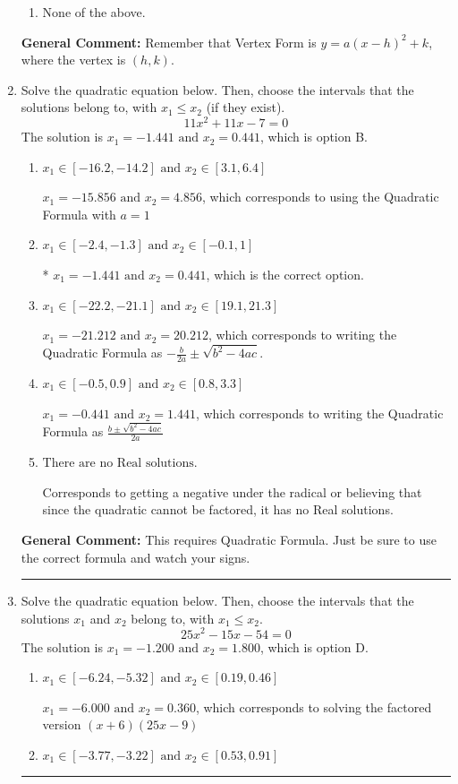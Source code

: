 \documentclass{extbook}[14pt]
\newcommand{\litem}[1]{\item #1

\rule{\textwidth}{0.4pt}}
\begin{document}
\begin{enumerate}
{\begin{enumerate}[label=\Alph*.]
\begin{multicols}{2}
\end{multicols}\item None of the above.\end{enumerate}
\textbf{General Comment:} Remember that Vertex Form is $y = a(x-h)^2+k$, where the vertex is $(h, k)$.
}
\litem{
Solve the quadratic equation below. Then, choose the intervals that the solutions belong to, with $x_1 \leq x_2$ (if they exist).
\[ 11x^{2} +11 x -7 = 0 \]The solution is \( x_1 = -1.441 \text{ and } x_2 = 0.441 \), which is option B.\begin{enumerate}[label=\Alph*.]
\item \( x_1 \in [-16.2, -14.2] \text{ and } x_2 \in [3.1, 6.4] \)

 $x_1 = -15.856 \text{ and } x_2 = 4.856$, which corresponds to using the Quadratic Formula with $a=1$
\item \( x_1 \in [-2.4, -1.3] \text{ and } x_2 \in [-0.1, 1] \)

* $x_1 = -1.441 \text{ and } x_2 = 0.441$, which is the correct option.
\item \( x_1 \in [-22.2, -21.1] \text{ and } x_2 \in [19.1, 21.3] \)

 $x_1 = -21.212 \text{ and } x_2 = 20.212$, which corresponds to writing the Quadratic Formula as $-\frac{b}{2a} \pm \sqrt{b^2 - 4ac}$.
\item \( x_1 \in [-0.5, 0.9] \text{ and } x_2 \in [0.8, 3.3] \)

 $x_1 = -0.441 \text{ and } x_2 = 1.441$, which corresponds to writing the Quadratic Formula as $\frac{b \pm \sqrt{b^2 - 4ac}}{2a}$
\item \( \text{There are no Real solutions.} \)

Corresponds to getting a negative under the radical or believing that since the quadratic cannot be factored, it has no Real solutions.
\end{enumerate}

\textbf{General Comment:} This requires Quadratic Formula. Just be sure to use the correct formula and watch your signs.
}
\litem{
Solve the quadratic equation below. Then, choose the intervals that the solutions $x_1$ and $x_2$ belong to, with $x_1 \leq x_2$.
\[ 25x^{2} -15 x -54 = 0 \]The solution is \( x_1 = -1.200 \text{ and } x_2 = 1.800 \), which is option D.\begin{enumerate}[label=\Alph*.]
\item \( x_1 \in [-6.24, -5.32] \text{ and } x_2 \in [0.19, 0.46] \)

$x_1 = -6.000 \text{ and } x_2 = 0.360$, which corresponds to solving the factored version $(x + 6)(25x -9)$
\item \( x_1 \in [-3.77, -3.22] \text{ and } x_2 \in [0.53, 0.91] \)


\end{enumerate}}
\end{enumerate}
\end{document}
